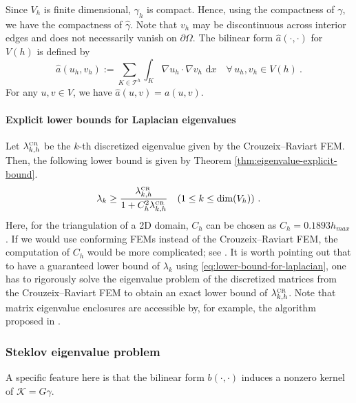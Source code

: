 \documentclass[a4,11pt]{article}
\numberwithin{equation}{section}
\newcommand{\ud}{\,\mbox{d}}
\newcommand{\CR}{\mbox{\tiny{CR}}}
\begin{document}
Since $V_h$ is finite dimensional,  $\gamma_h$ is compact. Hence, 
using the compactness of $\gamma$, we have the compactness of $\hat{\gamma}$.  
Note that $v_h$ may be discontinuous across interior edges and does not necessarily vanish on $\partial \Omega$.
The bilinear form $\widehat{a}(\cdot,\cdot)$ for ${V}(h)$ is defined by
\begin{equation}
\widehat{a}(u_h,v_h) := \sum_{K\in \mathcal{T}^h}\int_{K} 
\nabla u_h \cdot \nabla v_h \,\ud x
                          \quad \forall\, u_h, v_h\in {V}(h)\:.
\end{equation}
For any $u,v\in V$,  we have $\widehat{a}(u,v)=a(u,v)$. 

\paragraph{Explicit lower bounds for Laplacian eigenvalues}

Let $\lambda_{k,h}^{\CR}$ be the $k$-th discretized eigenvalue given by the Crouzeix--Raviart FEM. Then, the following lower bound is given by Theorem \ref{thm:eigenvalue-explicit-bound}.
\begin{equation}
	\label{eq:lower-bound-for-laplacian}
\lambda_k \ge \frac{\lambda_{k,h}^{\CR}}{1 + C_h^2\lambda_{k,h}^{\CR}}\quad (1\le k \le \text{dim}(V_h))~.
\end{equation}
Here, for the triangulation of a 2D domain, $C_h$ can be chosen as $C_h=0.1893h_{max}$ \cite{Liu-2015}.
If we would use conforming FEMs instead of  the Crouzeix--Raviart FEM, the computation of $C_h$ would be more complicated; see \cite{Liu-Oishi-2013}.
It is worth pointing out that to have a guaranteed lower bound of $\lambda_k$ using \cref{eq:lower-bound-for-laplacian}, one has to rigorously solve the eigenvalue problem of the discretized matrices from the Crouzeix--Raviart FEM to obtain an exact lower bound of $\lambda_{k,h}^{\CR}$. 
Note that matrix eigenvalue enclosures are accessible by, for example, the algorithm proposed in \cite{Behnke-1991}.

\subsubsection{Steklov eigenvalue problem}
A specific feature here is that the bilinear  form $b(\cdot,\cdot)$ induces a nonzero kernel of $\mathcal{K}=G\gamma$.
\end{document}
